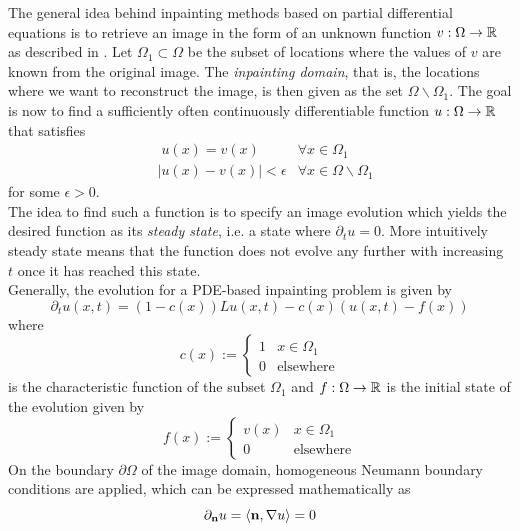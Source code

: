 The general idea behind inpainting methods based on partial differential equations  is to
retrieve an image in the form of an unknown function $v: \Omega \rightarrow \mathbb{R}$ as described in
\cite{galic05}. Let
$\Omega_1\subset\Omega$ be the subset of locations where the values of $v$ are 
known from the original image. The
\textit{inpainting domain}, that is, the locations where we want to reconstruct the image, is then
given as the set $\Omega\backslash\Omega_1$. The goal is now to find a sufficiently often
continuously differentiable function $u:\Omega\rightarrow\mathbb{R}$ that satisfies
\begin{align}
    &\; u(x) = v(x) &\forall x\in\Omega_1\\
    &\vert u(x) - v(x) \vert < \epsilon &\forall x\in\Omega\backslash\Omega_1
\end{align}
for some $\epsilon>0$.\\
The idea to find such a function is to specify an image evolution which yields the desired
function as its \textit{steady state}, i.e. a state where $\partial_tu = 0$. More intuitively 
steady state means that the function does not evolve any further with increasing $t$ once it has
reached this state.\\
Generally, the evolution for a PDE-based inpainting problem is given by
\begin{equation}
    \partial_t u(x,t) = (1-c(x))Lu(x,t) - c(x) (u(x, t) - f(x))\label{eq:Evolution}
\end{equation}
where 
\begin{equation} 
    c(x) := \begin{cases}
        1&x\in\Omega_1\\
        0&\text{elsewhere}
    \end{cases} 
\end{equation}
is the characteristic function of the subset $\Omega_1$ and $f:\Omega\rightarrow\mathbb{R}$ is the
initial state of the evolution given by
\begin{equation} 
    f(x) := \begin{cases}
        v(x)&x\in\Omega_1\\
        0&\text{elsewhere}
    \end{cases} 
\end{equation}
On the boundary $\partial\Omega$ of the image domain, homogeneous Neumann boundary conditions are
applied, which can be expressed mathematically as 
\begin{equation*}
    \partial_\mathbf{n}u = \langle \mathbf{n}, \mathbf{\nabla} u \rangle = 0
\end{equation*}

